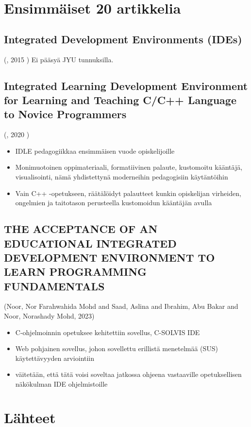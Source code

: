 \documentclass[11pt]{article}
\date{\today}
\title{}
\begin{document}
\tableofcontents


\section{Ensimmäiset 20 artikkelia}
\label{sec:orgad9843c}

\subsection{Integrated Development Environments (IDEs)}
\label{sec:org45e1fd0}
(,  2015 )
Ei pääsyä JYU tunnuksilla.

\subsection{Integrated Learning Development Environment for Learning and Teaching C/C++ Language to Novice Programmers}
\label{sec:org6e71405}
(,  2020 )

\begin{itemize}
\item IDLE pedagogiikkaa ensimmäisen vuode opiskelijoille
\item Monimuotoinen oppimateriaali, formatiivinen palaute, kustomoitu
kääntäjä, visualisointi, nämä yhdistettynä moderneihin pedagogisiin
käytäntöihin
\item Vain C++ -opetukseen, räätälöidyt palautteet kunkin opiskelijan
virheiden, ongelmien ja taitotason perusteella kustomoidun kääntäjän
avulla
\end{itemize}

\subsection{THE ACCEPTANCE OF AN EDUCATIONAL INTEGRATED DEVELOPMENT ENVIRONMENT TO LEARN PROGRAMMING FUNDAMENTALS}
\label{sec:orgeb610b5}
(Noor, Nor Farahwahida Mohd and Saad, Aslina and Ibrahim, Abu Bakar and Noor, Norashady Mohd, 2023)

\begin{itemize}
\item C-ohjelmoinnin opetuksee kehitettiin sovellus, C-SOLVIS IDE
\item Web pohjainen sovellus, johon sovellettu erillistä menetelmää
(SUS) käytettävyyden arviointiin
\item väitetään, että tätä voisi soveltaa jatkossa ohjeena vastaaville
opetuksellisen näkökulman IDE ohjelmistoille
\end{itemize}

\section{Lähteet}
\label{sec:org531bc91}
\end{document}
